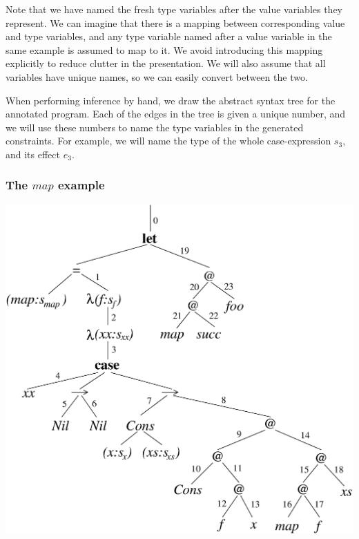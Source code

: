 Note that we have named the fresh type variables after the value variables they represent. We can imagine that there is a mapping between corresponding value and type variables, and any type variable named after a value variable in the same example is assumed to map to it. We avoid introducing this mapping explicitly to reduce clutter in the presentation.  We will also assume that all variables have unique names, so we can easily convert between the two.

When performing inference by hand, we draw the abstract syntax tree for the annotated program. Each of the edges in the tree is given a unique number, and we will use these numbers to name the type variables in the generated constraints. For example, we will name the type of the whole case-expression $s_3$, and its effect $e_3$. 

\clearpage{}
\subsubsection{The $map$ example}
\vspace{5em}
\begin{center}
\includegraphics[scale=0.5]{3-Inference/fig/constraints/example-map}
\end{center}

\vspace{8em}

